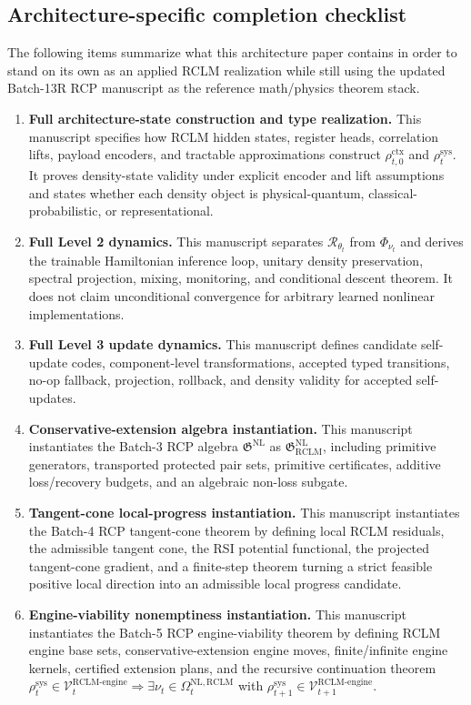 \documentclass[11pt,a4paper]{article}
\newcommand{\Vcal}{\mathcal V}
\newcommand{\Rcal}{\mathcal R}
\newcommand{\RCLM}{\mathrm{RCLM}}
\newcommand{\sys}{\mathrm{sys}}
\newcommand{\ctx}{\mathrm{ctx}}
\newcommand{\engine}{\mathrm{engine}}
\newcommand{\NL}{\mathrm{NL}}
\begin{document}
\subsection{Architecture-specific completion checklist}

The following items summarize what this architecture paper contains in order to stand on its own as an applied RCLM realization while still using the updated Batch-13R RCP manuscript as the reference math/physics theorem stack.
\begin{enumerate}[label=(\arabic*),leftmargin=1.5em]
    \item \textbf{Full architecture-state construction and type realization.} This manuscript specifies how RCLM hidden states, register heads, correlation lifts, payload encoders, and tractable approximations construct \(\rho_{t,0}^{\ctx}\) and \(\rho_t^{\sys}\).  It proves density-state validity under explicit encoder and lift assumptions and states whether each density object is physical-quantum, classical-probabilistic, or representational.
    \item \textbf{Full Level 2 dynamics.} This manuscript separates \(\Rcal_{\theta_t}\) from \(\Phi_{\nu_t}\) and derives the trainable Hamiltonian inference loop, unitary density preservation, spectral projection, mixing, monitoring, and conditional descent theorem.  It does not claim unconditional convergence for arbitrary learned nonlinear implementations.
    \item \textbf{Full Level 3 update dynamics.} This manuscript defines candidate self-update codes, component-level transformations, accepted typed transitions, no-op fallback, projection, rollback, and density validity for accepted self-updates.
    \item \textbf{Conservative-extension algebra instantiation.} This manuscript instantiates the Batch-3 RCP algebra \(\mathfrak G^{\NL}\) as \(\mathfrak G_{\RCLM}^{\NL}\), including primitive generators, transported protected pair sets, primitive certificates, additive loss/recovery budgets, and an algebraic non-loss subgate.
    \item \textbf{Tangent-cone local-progress instantiation.} This manuscript instantiates the Batch-4 RCP tangent-cone theorem by defining local RCLM residuals, the admissible tangent cone, the RSI potential functional, the projected tangent-cone gradient, and a finite-step theorem turning a strict feasible positive local direction into an admissible local progress candidate.
    \item \textbf{Engine-viability nonemptiness instantiation.} This manuscript instantiates the Batch-5 RCP engine-viability theorem by defining RCLM engine base sets, conservative-extension engine moves, finite/infinite engine kernels, certified extension plans, and the recursive continuation theorem \(\rho_t^{\sys}\in\Vcal_t^{\RCLM\text{-}\engine}\Rightarrow\exists\nu_t\in\Omega_t^{\NL,\RCLM}\) with \(\rho_{t+1}^{\sys}\in\Vcal_{t+1}^{\RCLM\text{-}\engine}\).

\end{enumerate}
\end{document}
